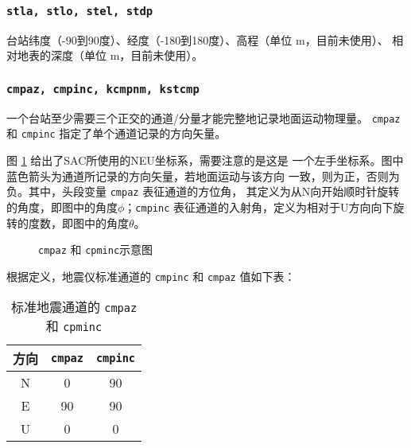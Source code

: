 \subsubsection{\texttt{stla, stlo, stel, stdp}}
台站纬度（-90到90度）、经度（-180到180度）、高程（单位 \si{m}，目前未使用）、
相对地表的深度（单位 \si{m}，目前未使用）。

\subsubsection{\texttt{cmpaz, cmpinc, kcmpnm, kstcmp}}
一个台站至少需要三个正交的通道/分量才能完整地记录地面运动物理量。
\texttt{cmpaz} 和 \texttt{cmpinc} 指定了单个通道记录的方向矢量。

图 \ref{fig:cmpaz-cmpinc} 给出了SAC所使用的NEU坐标系，需要注意的是这是
一个左手坐标系。图中蓝色箭头为通道所记录的方向矢量，若地面运动与该方向
一致，则为正，否则为负。其中，头段变量 \texttt{cmpaz} 表征通道的方位角，
其定义为从N向开始顺时针旋转的角度，即图中的角度$\phi$；\texttt{cmpinc}
表征通道的入射角，定义为相对于U方向向下旋转的度数，即图中的角度$\theta$。

\begin{figure}[H]
\centering
{}
\caption{\texttt{cmpaz} 和 \texttt{cpminc}示意图}
\label{fig:cmpaz-cmpinc}
\end{figure}

根据定义，地震仪标准通道的 \texttt{cmpinc} 和 \texttt{cmpaz} 值如下表：
\begin{table}[H]
\caption{标准地震通道的 \texttt{cmpaz} 和 \texttt{cpminc}}
\label{table:neu-cmpaz-cmpinc}
\centering
\begin{tabular}{ccc}
\toprule
方向    &   \texttt{cmpaz}   &   \texttt{cmpinc}  \\
\midrule
N       &   0       &   90          \\
E       &   90      &   90          \\
U       &   0       &   0           \\
\bottomrule
\end{tabular}
\end{table}

